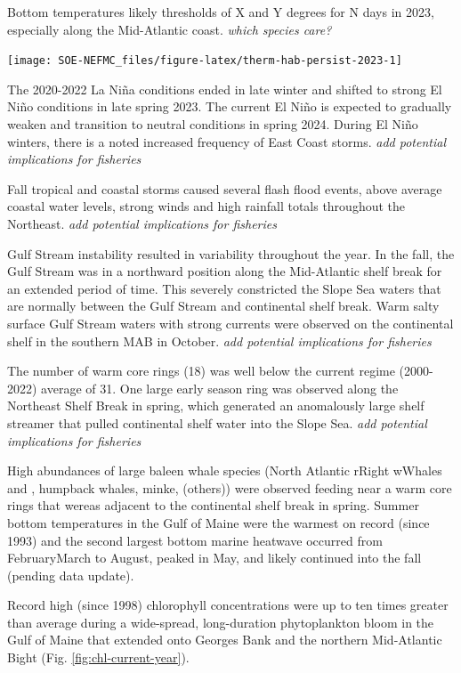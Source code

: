 \documentclass[
  10pt,
]{article}
\begin{document}
Bottom temperatures likely thresholds of X and Y degrees for N days in 2023, especially along the Mid-Atlantic coast. \emph{which species care?}

\begin{center}\texttt{[image: SOE-NEFMC\_files/figure-latex/therm-hab-persist-2023-1]} \end{center}

The 2020-2022 La Niña conditions ended in late winter and shifted to strong El Niño conditions in late spring 2023. The current El Niño is expected to gradually weaken and transition to neutral conditions in spring 2024. During El Niño winters, there is a noted increased frequency of East Coast storms. \emph{add potential implications for fisheries}

Fall tropical and coastal storms caused several flash flood events, above average coastal water levels, strong winds and high rainfall totals throughout the Northeast. \emph{add potential implications for fisheries}

Gulf Stream instability resulted in variability throughout the year. In the fall, the Gulf Stream was in a northward position along the Mid-Atlantic shelf break for an extended period of time. This severely constricted the Slope Sea waters that are normally between the Gulf Stream and continental shelf break. Warm salty surface Gulf Stream waters with strong currents were observed on the continental shelf in the southern MAB in October. \emph{add potential implications for fisheries}

The number of warm core rings (18) was well below the current regime (2000-2022) average of 31. One large early season ring was observed along the Northeast Shelf Break in spring, which generated an anomalously large shelf streamer that pulled continental shelf water into the Slope Sea. \emph{add potential implications for fisheries}

High abundances of large baleen whale species (North Atlantic rRight wWhales and , humpback whales, minke, (others)) were observed feeding near a warm core rings that wereas adjacent to the continental shelf break in spring.
Summer bottom temperatures in the Gulf of Maine were the warmest on record (since 1993) and the second largest bottom marine heatwave occurred from FebruaryMarch to August, peaked in May, and likely continued into the fall (pending data update).

Record high (since 1998) chlorophyll concentrations were up to ten times greater than average during a wide-spread, long-duration phytoplankton bloom in the Gulf of Maine that extended onto Georges Bank and the northern Mid-Atlantic Bight (Fig. \ref{fig:chl-current-year}).
\end{document}
